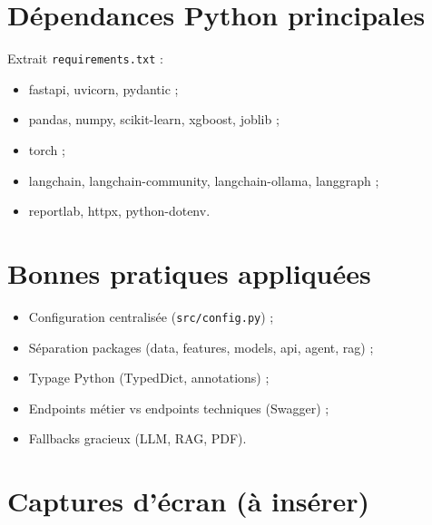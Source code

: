 \section{Dépendances Python principales}

Extrait \texttt{requirements.txt} :
\begin{itemize}[leftmargin=*]
  \item fastapi, uvicorn, pydantic ;
  \item pandas, numpy, scikit-learn, xgboost, joblib ;
  \item torch ;
  \item langchain, langchain-community, langchain-ollama, langgraph ;
  \item reportlab, httpx, python-dotenv.
\end{itemize}

\section{Bonnes pratiques appliquées}

\begin{itemize}[leftmargin=*]
  \item Configuration centralisée (\texttt{src/config.py}) ;
  \item Séparation packages (data, features, models, api, agent, rag) ;
  \item Typage Python (TypedDict, annotations) ;
  \item Endpoints métier vs endpoints techniques (Swagger) ;
  \item Fallbacks gracieux (LLM, RAG, PDF).
\end{itemize}

\section{Captures d'écran (à insérer)}

